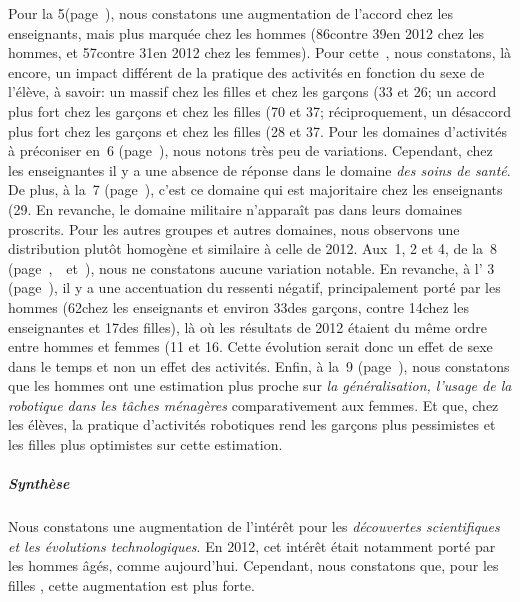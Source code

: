             Pour la 5\ieme {}({\footnotesize page~\pageref{QA5-5}}), nous constatons une augmentation de l'accord chez les enseignants, mais plus marquée chez les hommes (86\prc contre 39\prc en 2012 chez les hommes, et 57\prc contre 31\prc en 2012 chez les femmes). 
            Pour cette~, nous constatons, là encore, un impact différent de la pratique des activités en fonction du sexe de l'élève, à savoir: un  massif chez les filles  et chez les garçons  (33 et 26\prc[)]; un accord plus fort chez les garçons  et chez les filles  (70 et 37\prc[)]; réciproquement, un désaccord plus fort chez les garçons  et chez les filles  (28 et 37\prc[)].
            Pour les domaines d'activités à préconiser en~6 ({\footnotesize page~\pageref{QA6}}), nous notons très peu de variations. Cependant, chez les enseignantes il y a une absence de réponse dans le domaine \textit{des soins de santé}.
            De plus, à la~7 ({\footnotesize page~\pageref{QA7}}), c'est ce domaine qui est majoritaire chez les enseignants (29\prc[)]. 
            En revanche, le domaine militaire n'apparaît pas dans leurs domaines proscrits. 
            Pour les autres groupes et autres domaines, nous observons une distribution plutôt homogène et similaire à celle de 2012.
            Aux~1, 2 et 4, de la~8 ({\footnotesize page~\pageref{QA8-1},~\pageref{QA8-2}~et~\pageref{QA8-4}}), nous ne constatons aucune variation notable.
            En revanche, à l' 3 ({\footnotesize page~\pageref{QA8-3}}), il y a une accentuation du ressenti négatif, principalement porté par les hommes (62\prc chez les enseignants et environ 33\prc des garçons, contre 14\prc chez les enseignantes et 17\prc des filles), là où les résultats de 2012 étaient du même ordre entre hommes et femmes (11 et 16\prc[)].
            Cette évolution serait donc un effet de sexe dans le temps et non un effet des activités.
            Enfin, à la~9 ({\footnotesize page~\pageref{QA9}}), nous constatons que les hommes ont une estimation plus proche sur \textit{la généralisation, l'usage de la robotique dans les tâches ménagères} comparativement aux femmes. Et que, chez les élèves, la pratique d'activités robotiques rend les garçons plus pessimistes et les filles plus optimistes sur cette estimation.
          \subparagraph{Synthèse}
            Nous constatons une augmentation de l'intérêt pour les \textit{découvertes scientifiques et les évolutions technologiques}. En 2012, cet intérêt était notamment porté par les hommes âgés, comme aujourd'hui. Cependant, nous constatons que, pour les filles , cette augmentation est plus forte.
